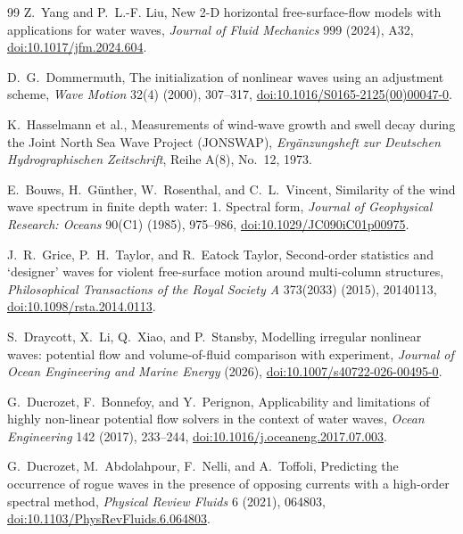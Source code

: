 \documentclass[11pt]{article}
\begin{document}
\begin{thebibliography}{99}
Z.~Yang and P.~L.-F. Liu,
\newblock New 2-D horizontal free-surface-flow models with applications for
water waves,
\newblock \emph{Journal of Fluid Mechanics} 999 (2024), A32,
\href{https://doi.org/10.1017/jfm.2024.604}
{doi:10.1017/jfm.2024.604}.

D.~G.~Dommermuth,
\newblock The initialization of nonlinear waves using an adjustment scheme,
\newblock \emph{Wave Motion} 32(4) (2000), 307--317,
\href{https://doi.org/10.1016/S0165-2125(00)00047-0}
{doi:10.1016/S0165-2125(00)00047-0}.

K.~Hasselmann et al.,
\newblock Measurements of wind-wave growth and swell decay during the Joint
North Sea Wave Project (JONSWAP),
\newblock \emph{Erg\"anzungsheft zur Deutschen Hydrographischen Zeitschrift},
Reihe A(8), No.~12, 1973.

E.~Bouws, H.~G\"unther, W.~Rosenthal, and C.~L.~Vincent,
\newblock Similarity of the wind wave spectrum in finite depth water:
1. Spectral form,
\newblock \emph{Journal of Geophysical Research: Oceans} 90(C1) (1985),
975--986,
\href{https://doi.org/10.1029/JC090iC01p00975}
{doi:10.1029/JC090iC01p00975}.

J.~R.~Grice, P.~H.~Taylor, and R.~Eatock Taylor,
\newblock Second-order statistics and `designer' waves for violent
free-surface motion around multi-column structures,
\newblock \emph{Philosophical Transactions of the Royal Society A} 373(2033)
(2015), 20140113,
\href{https://doi.org/10.1098/rsta.2014.0113}
{doi:10.1098/rsta.2014.0113}.

S.~Draycott, X.~Li, Q.~Xiao, and P.~Stansby,
\newblock Modelling irregular nonlinear waves: potential flow and
volume-of-fluid comparison with experiment,
\newblock \emph{Journal of Ocean Engineering and Marine Energy} (2026),
\href{https://doi.org/10.1007/s40722-026-00495-0}
{doi:10.1007/s40722-026-00495-0}.

G.~Ducrozet, F.~Bonnefoy, and Y.~Perignon,
\newblock Applicability and limitations of highly non-linear potential flow
solvers in the context of water waves,
\newblock \emph{Ocean Engineering} 142 (2017), 233--244,
\href{https://doi.org/10.1016/j.oceaneng.2017.07.003}
{doi:10.1016/j.oceaneng.2017.07.003}.

G.~Ducrozet, M.~Abdolahpour, F.~Nelli, and A.~Toffoli,
\newblock Predicting the occurrence of rogue waves in the presence of
opposing currents with a high-order spectral method,
\newblock \emph{Physical Review Fluids} 6 (2021), 064803,
\href{https://doi.org/10.1103/PhysRevFluids.6.064803}
{doi:10.1103/PhysRevFluids.6.064803}.

\end{thebibliography}
\end{document}
